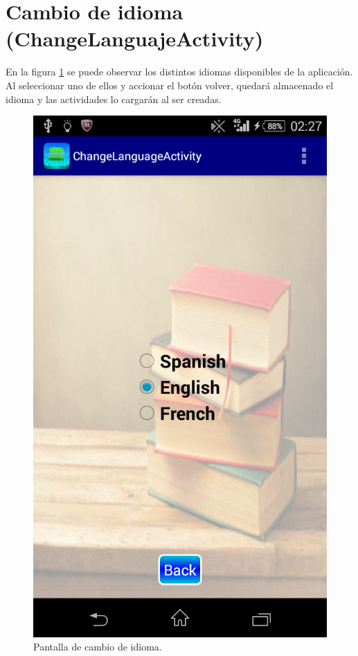 	\section{Cambio de idioma (ChangeLanguajeActivity)}
	
		En la figura \ref{fig:languaje} se puede observar los distintos idiomas disponibles de la aplicación. Al seleccionar uno de ellos y accionar el botón volver, quedará almacenado el idioma y las actividades lo cargarán al ser creadas.
	
		\begin{figure}[h !]
			\centering
			\includegraphics[scale=0.2]{Imagenes/App/ChangeLanguaje}
			\caption{Pantalla de cambio de idioma.}
			\label{fig:languaje}
		\end{figure}
			
